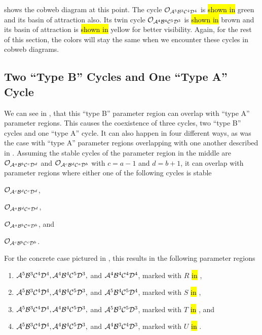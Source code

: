  shows the cobweb diagram at this point.
The cycle $\mathcal{O}_{\mathcal{A}^5\mathcal{B}^3\mathcal{C}^4\mathcal{D}^4}$ is \hl{shown in} green and its basin of attraction also.
Its twin cycle $\mathcal{O}_{\mathcal{A}^4\mathcal{B}^4\mathcal{C}^5\mathcal{D}^3}$ is \hl{shown in} brown and its basin of attraction is \hl{shown in} yellow for better visibility.
Again, for the rest of this section, the colors will stay the same when we encounter these cycles in cobweb diagrams.

\subsection{Two ``Type B'' Cycles and One ``Type A'' Cycle}
\label{sec:arch.coex.AB}

We can see in , that this ``type B'' parameter region can overlap with ``type A'' parameter regions.
This causes the coexistence of three cycles, two ``type B'' cycles and one ``type A'' cycle.
It can also happen in four different ways, as was the case with ``type A'' parameter regions overlapping with one another described in .
Assuming the stable cycles of the parameter region in the middle are $\mathcal{O}_{\mathcal{A}^a\mathcal{B}^b\mathcal{C}^c\mathcal{D}^d}$ and $\mathcal{O}_{\mathcal{A}^c\mathcal{B}^d\mathcal{C}^a\mathcal{D}^b}$ with $c = a - 1$ and $d = b + 1$, it can overlap with parameter regions where either one of the following cycles is stable
\begin{enumerate*}
	\item $\mathcal{O}_{\mathcal{A}^c\mathcal{B}^d\mathcal{C}^c\mathcal{D}^d}$,
	\item $\mathcal{O}_{\mathcal{A}^a\mathcal{B}^d\mathcal{C}^a\mathcal{D}^d}$,
	\item $\mathcal{O}_{\mathcal{A}^a\mathcal{B}^b\mathcal{C}^a\mathcal{D}^b}$, and
	\item $\mathcal{O}_{\mathcal{A}^c\mathcal{B}^b\mathcal{C}^c\mathcal{D}^b}$.
\end{enumerate*}
For the concrete case pictured in , this results in the following parameter regions
\begin{enumerate}
	\item $\mathcal{A}^5\mathcal{B}^3\mathcal{C}^4\mathcal{D}^4, \mathcal{A}^4\mathcal{B}^4\mathcal{C}^5\mathcal{D}^3,$ and $\mathcal{A}^4\mathcal{B}^4\mathcal{C}^4\mathcal{D}^4$, marked with $R$ \hl{in} ,
	\item $\mathcal{A}^5\mathcal{B}^3\mathcal{C}^4\mathcal{D}^4, \mathcal{A}^4\mathcal{B}^4\mathcal{C}^5\mathcal{D}^3,$ and $\mathcal{A}^5\mathcal{B}^4\mathcal{C}^5\mathcal{D}^4$, marked with $S$ \hl{in} ,
	\item $\mathcal{A}^5\mathcal{B}^3\mathcal{C}^4\mathcal{D}^4, \mathcal{A}^4\mathcal{B}^4\mathcal{C}^5\mathcal{D}^3,$ and $\mathcal{A}^5\mathcal{B}^3\mathcal{C}^5\mathcal{D}^3$, marked with $T$ \hl{in} , and
	\item $\mathcal{A}^5\mathcal{B}^3\mathcal{C}^4\mathcal{D}^4, \mathcal{A}^4\mathcal{B}^4\mathcal{C}^5\mathcal{D}^3,$ and $\mathcal{A}^4\mathcal{B}^3\mathcal{C}^4\mathcal{D}^3$, marked with $U$ \hl{in} .
\end{enumerate}

